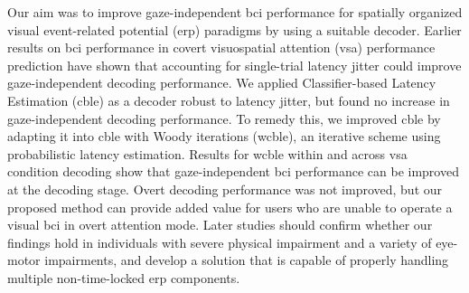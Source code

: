 Our aim was to improve gaze-independent \ac{bci} performance for spatially
organized visual event-related potential (\ac{erp}) paradigms by using a suitable
decoder.
Earlier results on \ac{bci} performance in covert visuospatial attention
(\ac{vsa}) performance prediction have shown that accounting for single-trial
latency jitter could improve gaze-independent decoding performance.
We applied Classifier-based Latency Estimation (\ac{cble}) as a decoder robust to latency
jitter, but found no increase in gaze-independent decoding performance.
To remedy this, we improved \ac{cble} by adapting it into \ac{cble} with Woody
iterations (\ac{wcble}), an iterative scheme using probabilistic latency estimation.
Results for \ac{wcble} within and across \ac{vsa} condition decoding show that
gaze-independent \ac{bci} performance can be improved at the decoding stage.
Overt decoding performance was not improved, but our proposed method can
provide added value for users who are unable to operate a visual \ac{bci} in overt
attention mode.
Later studies should confirm whether our findings hold in individuals with
severe physical impairment and a variety of eye-motor impairments, and develop a
solution that is capable of properly handling multiple non-time-locked \ac{erp}
components.

